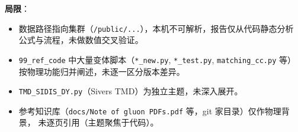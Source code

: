 \documentclass[UTF8,11pt]{ctexart}
\begin{document}
\textbf{局限}：
\begin{itemize}
  \item 数据路径指向集群（\texttt{/public/...}），本机不可解析，报告仅从代码静态分析
  公式与流程，未做数值交叉验证。
  \item \texttt{99\_ref\_code} 中大量变体脚本（\texttt{*\_new.py}, \texttt{*\_test.py},
  \texttt{matching\_cc.py} 等）按物理功能归并阐述，未逐一区分版本差异。
  \item \texttt{TMD\_SIDIS\_DY.py}（Sivers TMD）为独立主题，未深入展开。
  \item 参考知识库（\texttt{docs/Note of gluon PDFs.pdf} 等，git 家目录）仅作物理背景，
  未逐页引用（主题聚焦于代码）。
\end{itemize}
\end{document}
